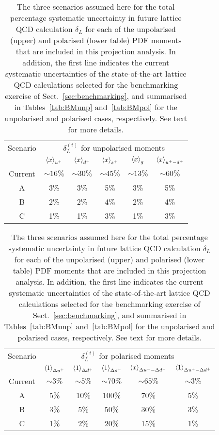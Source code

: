 \begin{table}[t]
  \centering
  \renewcommand{\arraystretch}{1.3} 
  \begin{tabular}{c||ccccc}
    \hline
    Scenario &  \multicolumn{5}{c}{$\delta_L^{(i)}$ for unpolarised moments}   \\
&    $\left\langle x\right\rangle_{u^+}$  &   $\left\langle x\right\rangle_{d^+}$   &  $\left\langle x\right\rangle_{s^+}$  &
$\left\langle x\right\rangle_{g}$  &   $\left\langle x\right\rangle_{u^+-d^+}$  \\
    \hline
    \hline
    Current  & $\sim 16\%$  &  $\sim 30\%$ 
    & $\sim 45\%$  & $\sim 13\%$  &  $\sim 60\%$ \\
    A   & 3\%  & 3\% &  5\% &  3\% &  5\% \\
 B   & 2\%  & 2\% &  4\% &  2\% &  4\%  \\
  C   & 1\%  & 1\% &  3\% &  1\% &  3\%  \\
    \hline
  \end{tabular}\vspace{0.7cm}
   \begin{tabular}{c||ccccc}
    \hline
    Scenario   &
    \multicolumn{5}{c}{$\delta_L^{(i)}$ for polarised moments} \\ 
& $\left\langle 1\right\rangle_{\Delta u^+}$  & $\left\langle 1\right\rangle_{\Delta d^+}$  & $\left\langle 1\right\rangle_{\Delta s^+}$
&  $\left\langle x\right\rangle_{\Delta u^--\Delta d^-}$  &  $\left\langle 1\right\rangle_{\Delta u^+ - \Delta d^+}$\\
    \hline
    \hline
    Current  &
    $\sim 3\%$  & $\sim 5\%$ & $\sim 70\%$ & $\sim 65\%$ & $\sim 3\%$ \\
    \hline
    A   & 
    5\% &    10\%  &   100\% &    70\%  &    5\% \\
 B   &
 3\% &    5\%  &   50\% &    30\%  &    3\% \\
  C   & 1\% &    2\%  &   20\% &    15\%  &    1\% \\
    \hline
  \end{tabular}
   \caption{\small The three scenarios assumed here
     for the total percentage
     systematic uncertainty
    in future lattice QCD calculation $\delta_L$ for each
    of the unpolarised (upper) and polarised (lower table) PDF
    moments that are included
    in this projection analysis.
    In addition, the first line indicates the current systematic
    uncertainties of the state-of-the-art lattice QCD calculations
    selected for the benchmarking exercise of Sect.~\ref{sec:benchmarking},
    and summarised in Tables~\ref{tab:BMunp} and~\ref{tab:BMpol}
    for the unpolarised and polarised cases, respectively.
    See text for more details.
\label{tab:scenarios}
  }
\end{table}

